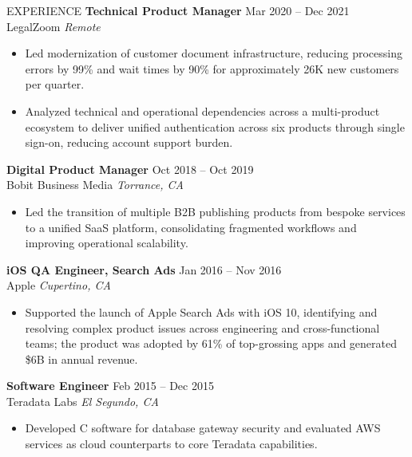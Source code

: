 \documentclass{resume}
\begin{document}
\begin{rSection}{EXPERIENCE}
\textbf{Technical Product Manager} \hfill Mar 2020 -- Dec 2021\\
LegalZoom \hfill \textit{Remote}
\begin{itemize}
\itemsep -3pt
\item Led modernization of customer document infrastructure, reducing processing errors by 99\% and wait times by 90\% for approximately 26K new customers per quarter.
\item Analyzed technical and operational dependencies across a multi-product ecosystem to deliver unified authentication across six products through single sign-on, reducing account support burden.
\end{itemize}

\textbf{Digital Product Manager} \hfill Oct 2018 -- Oct 2019\\
Bobit Business Media \hfill \textit{Torrance, CA}
\begin{itemize}
\itemsep -3pt
\item Led the transition of multiple B2B publishing products from bespoke services to a unified SaaS platform, consolidating fragmented workflows and improving operational scalability.
\end{itemize}

\textbf{iOS QA Engineer, Search Ads} \hfill Jan 2016 -- Nov 2016\\
Apple \hfill \textit{Cupertino, CA}
\begin{itemize}
\itemsep -3pt
\item Supported the launch of Apple Search Ads with iOS 10, identifying and resolving complex product issues across engineering and cross-functional teams; the product was adopted by 61\% of top-grossing apps and generated \$6B in annual revenue.
\end{itemize}

\textbf{Software Engineer} \hfill Feb 2015 -- Dec 2015\\
Teradata Labs \hfill \textit{El Segundo, CA}
\begin{itemize}
\itemsep -3pt
\item Developed C software for database gateway security and evaluated AWS services as cloud counterparts to core Teradata capabilities.
\end{itemize}

\end{rSection}
\end{document}
